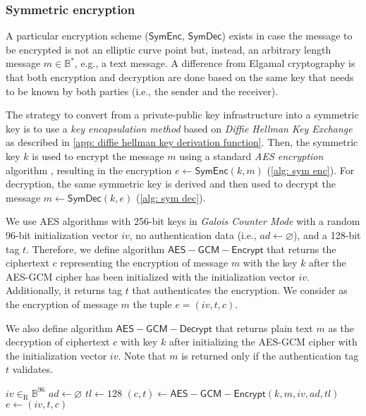 \subsubsection{Symmetric encryption} \label{app: symmetric encryption}
A particular encryption scheme ($\mathsf{SymEnc}$, $\mathsf{SymDec}$) exists in case the message to be encrypted is not an elliptic curve point but, instead, an arbitrary length message $m \in \mathbb{B}^*$, e.g., a text message. A difference from Elgamal cryptography is that both encryption and decryption are done based on the same key that needs to be known by both parties (i.e., the sender and the receiver). 

The strategy to convert from a private-public key infrastructure into a symmetric key is to use a \textit{key encapsulation method} based on \textit{Diffie Hellman Key Exchange} as described in \cref{app: diffie hellman key derivation function}. Then, the symmetric key $k$ is used to encrypt the message $m$ using a standard \textit{AES encryption} algorithm \cite{NIST01}, resulting in the encryption $e \gets \mathsf{SymEnc} (k, m)$ (\cref{alg: sym enc}). For decryption, the same symmetric key is derived and then used to decrypt the message $m \gets \mathsf{SymDec} (k, e)$ (\cref{alg: sym dec}).

We use AES algorithms with 256-bit keys in \textit{Galois Counter Mode} with a random 96-bit initialization vector $iv$, no authentication data (i.e., $ad \gets \varnothing$), and a 128-bit tag $t$. Therefore, we define algorithm $\mathsf{AES-GCM-Encrypt}$ that returns the ciphertext $c$ representing the encryption of message $m$ with the key $k$ after the AES-GCM cipher has been initialized with the initialization vector $iv$. Additionally, it returns tag $t$ that authenticates the encryption. We consider as the encryption of message $m$ the tuple $e = (iv, t, c)$.

We also define algorithm $\mathsf{AES-GCM-Decrypt}$ that returns plain text $m$ as the decryption of ciphertext $c$ with key $k$ after initializing the AES-GCM cipher with the initialization vector $iv$. Note that $m$ is returned only if the authentication tag $t$ validates.

\begin{algorithm}[ht]
    \DontPrintSemicolon
    \caption{$\mathsf{SymEnc} (k, m)$}
    \label{alg: sym enc}
    
    $iv \in_\mathrm{R} \mathbb{B}^{96}$ \;
    $ad \gets \varnothing$ \;
    $tl \gets 128$ \;
    $(c, t) \gets \mathsf{AES-GCM-Encrypt} (k, m, iv, ad, tl)$ \;
    $e \gets (iv, t, c)$ \;
     
\end{algorithm}

